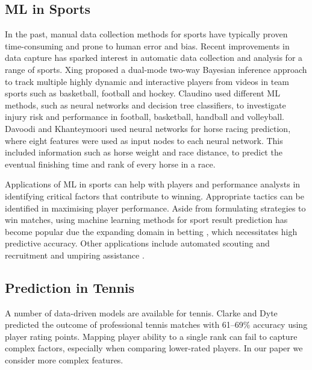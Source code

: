 \subsection{ML in Sports}

In the past, manual data collection methods for sports have typically proven time-consuming and prone to human error and bias. Recent improvements in data capture has sparked interest in automatic data collection and analysis for a range of sports. Xing \etal \cite{xing2010multiple} proposed a dual-mode two-way Bayesian inference approach to track multiple highly dynamic and interactive players from videos in team sports such as basketball, football and hockey. Claudino \etal \cite{claudino2019current} used different ML methods, such as neural networks and decision tree classifiers, to investigate injury risk and performance in football, basketball, handball and volleyball. Davoodi and Khanteymoori \cite{davoodi2010horse} used neural networks for horse racing prediction, where eight features were used as input nodes to each neural network. This included information such as horse weight and race distance, to predict the eventual finishing time and rank of every horse in a race. 




Applications of ML in sports can help with players and performance analysts in identifying critical factors that contribute to winning. Appropriate tactics can be identified in maximising player performance.
Aside from formulating strategies to win matches, using machine learning methods for sport result prediction has become popular due the expanding domain in betting \cite{bunker2019machine}, which necessitates high predictive accuracy. Other applications include automated scouting and recruitment \cite{bunker2019machine} and umpiring assistance \cite{vzemgulys2018recognition}.


\subsection{Prediction in Tennis}
A number of data-driven models are available for tennis. 
Clarke and Dyte \cite{clarke2000using} predicted the outcome of professional tennis matches with 61--69\% accuracy using player rating points. Mapping player ability to a single rank can fail to capture complex factors, especially when comparing lower-rated players. In our paper we consider more complex features.

